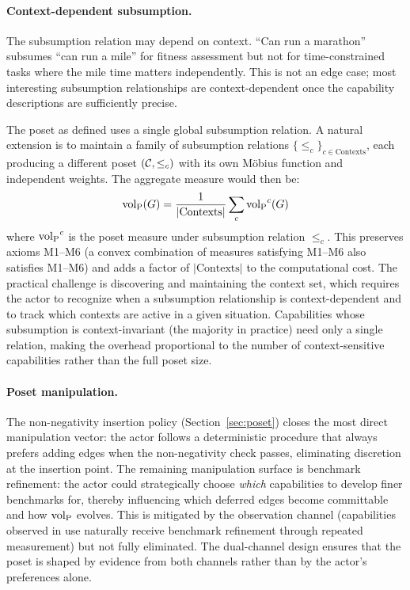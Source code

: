 \paragraph{Context-dependent subsumption.} The subsumption relation may depend
on context. ``Can run a marathon'' subsumes ``can run a mile'' for fitness
assessment but not for time-constrained tasks where the mile time matters
independently. This is not an edge case; most interesting subsumption
relationships are context-dependent once the capability descriptions are
sufficiently precise.

The poset as defined uses a single global subsumption relation.
A natural extension is to maintain a family of subsumption relations
$\{\leq_c\}_{c \in \text{Contexts}}$, each producing a different poset
$(\mathcal{C}, \leq_c)$ with its own M\"{o}bius function and independent weights.
The aggregate measure would then be:
\begin{equation}
\label{eq:context_vol}
{\operatorname{vol}_{\mathrm{P}}}(G) = \frac{1}{|\text{Contexts}|} \sum_c {\operatorname{vol}_{\mathrm{P}}}^c(G)
\end{equation}
where ${\operatorname{vol}_{\mathrm{P}}}^c$ is the poset measure under subsumption relation $\leq_c$.
This preserves axioms M1--M6 (a convex combination of measures satisfying M1--M6
also satisfies M1--M6) and adds a factor of $|\text{Contexts}|$ to the
computational cost. The practical challenge is discovering and maintaining
the context set, which requires the actor to recognize when a subsumption
relationship is context-dependent and to track which contexts are active in a
given situation. Capabilities whose subsumption is context-invariant (the
majority in practice) need only a single relation, making the overhead
proportional to the number of context-sensitive capabilities rather than the
full poset size.

\paragraph{Poset manipulation.} The non-negativity insertion policy
(Section~\ref{sec:poset}) closes the most direct manipulation vector: the
actor follows a deterministic procedure that always prefers adding edges when
the non-negativity check passes, eliminating discretion at the insertion
point. The remaining manipulation surface is benchmark refinement: the actor
could strategically choose \emph{which} capabilities to develop finer
benchmarks for, thereby influencing which deferred edges become committable
and how ${\operatorname{vol}_{\mathrm{P}}}$ evolves. This is mitigated by the observation channel
(capabilities observed in use naturally receive benchmark refinement through
repeated measurement) but not fully eliminated. The dual-channel design
ensures that the poset is shaped by evidence from both channels rather than
by the actor's preferences alone.

